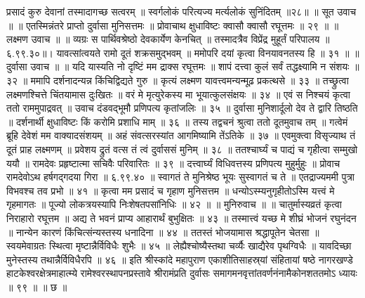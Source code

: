 प्रसादं कुरु देवानां तस्मादागच्छ सत्वरम् ॥
स्वर्गलोकं परित्यज्य मर्त्यलोकं सुनिंदितम् ॥२८॥
॥ सूत उवाच ॥ ॥
एतस्मिन्नंतरे प्राप्तो दुर्वासा मुनिसत्तमः ॥
प्रोवाचाथ क्षुधाविष्टः क्वासौ क्वासौ रघूत्तमः ॥ २९ ॥
॥ लक्ष्मण उवाच ॥ ॥
व्यग्रः स पार्थिवश्रेष्ठो देवकार्येण केनचित् ॥
तस्मादत्रैव विप्रेंद्र मुहूर्तं परिपालय ॥६.९९.३०॥।
यावत्सांत्वयते रामो दूतं शक्रसमुद्भवम् ॥
ममोपरि दयां कृत्वा विनयावनतस्य हि ॥ ३१ ॥
॥ दुर्वासा उवाच ॥ ॥
यदि यास्यति नो दृष्टिं मम द्राक्स रघूत्तमः ॥
शापं दत्त्वा कुलं सर्वं तद्धक्ष्यामि न संशयः ॥ ३२ ॥
ममापि दर्शनादन्यन्न किंचिद्विद्यते गुरु ॥
कृत्यं लक्ष्मण यावत्त्वमन्यन्मूढ़ प्रकत्थसे ॥ ३३ ॥
तच्छ्रुत्वा लक्ष्मणश्चित्ते चिंतयामास दुःखितः ॥
वरं मे मृत्युरेकस्य मा भूयात्कुलसंक्षयः ॥ ३४ ॥
एवं स निश्चयं कृत्वा ततो राममुपाद्रवत् ॥
उवाच दंडवद्भूमौ प्रणिपत्य कृतांजलिः ॥ ३५ ॥
दुर्वासा मुनिशार्दूलो देव ते द्वारि तिष्ठति ॥
दर्शनार्थी क्षुधाविष्टः किं करोमि प्रशाधि माम् ॥ ३६ ॥
तस्य तद्वचनं श्रुत्वा ततो दूतमुवाच तम् ॥
गत्वेमं ब्रूहि देवेशं मम वाक्यादसंशयम् ॥
अहं संवत्सरस्यांत आगमिष्यामि तेंऽतिके ॥ ३७ ॥
एवमुक्त्वा विसृज्याथ तं दूतं प्राह लक्ष्मणम् ॥
प्रवेशय द्रुतं वत्स तं त्वं दुर्वाससं मुनिम् ॥ ३८ ॥
ततश्चार्घ्यं च पाद्यं च गृहीत्वा सम्मुखो ययौ ॥
रामदेवः प्रहृष्टात्मा सचिवैः परिवारितः ॥ ३९ ॥
दत्त्वार्घ्यं विधिवत्तस्य प्रणिपत्य मुहुर्मुहुः ॥
प्रोवाच रामदेवोऽथ हर्षगद्गदया गिरा ॥ ६.९९.४० ॥
स्वागतं ते मुनिश्रेष्ठ भूयः सुस्वागतं च ते ॥
एतद्राज्यममी पुत्रा विभवश्च तव प्रभो ॥ ४१ ॥
कृत्वा मम प्रसादं च गृहाण मुनिसत्तम ॥
धन्योऽस्म्यनुगृहीतोऽस्मि यत्त्वं मे गृहमागतः ॥
पूज्यो लोकत्रयस्यापि निःशेषतपसांनिधिः ॥ ४२ ॥
॥ मुनिरुवाच ॥ ॥
चातुर्मास्यव्रतं कृत्वा निराहारो रघूत्तम ॥
अद्य ते भवनं प्राप्य आहारार्थं बुभुक्षितः ॥ ४३ ॥
तस्मात्त्वं यच्छ मे शीघ्रं भोजनं रघुनंदन ॥
नान्येन कारणं किंचित्संन्यस्तस्य धनादिना ॥ ४४ ॥
ततस्तं भोजयामास श्रद्धापूतेन चेतसा ॥
स्वयमेवाग्रतः स्थित्वा मृष्टान्नैर्विविधैः शुभैः ॥ ४५ ॥
लेह्यैश्चोष्यैस्तथा चर्व्यैः खाद्यैरेव पृथग्विधैः ॥
यावदिच्छा मुनेस्तस्य तथान्नैर्विविधैरपि ॥ ४६ ॥
इति श्रीस्कांदे महापुराण एकाशीतिसाहस्र्यां संहितायां षष्ठे नागरखण्डे हाटकेश्वरक्षेत्रमाहात्म्ये रामेश्वरस्थापनप्रस्तावे श्रीरामंप्रति दुर्वासः समागमनवृत्तांतवर्णनंनामैकोनशततमोऽ ध्यायः ॥ ९९ ॥ ॥ छ ॥


